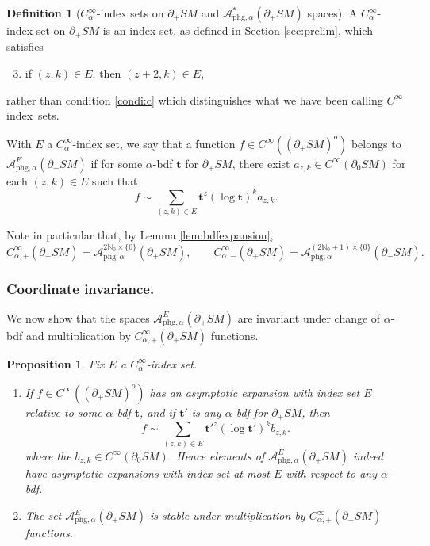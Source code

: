 \documentclass[11pt]{article}
\newenvironment{enumeratea}
{\bgroup\def\theenumi{\alph{enumi}}\begin{enumerate}}
{\end{enumerate}\egroup}
\theoremstyle{plain}
\newtheorem{Proposition}[Theorem]{Proposition}
\theoremstyle{definition}
\newtheorem{Definition}[Theorem]{Definition}
\theoremstyle{remark}
\def\Nm{{\mathbb{N}}}
\def\A{\mathcal{A}}
\newcommand{\bt}{{\boldsymbol{t}}}
\newcommand{\phg}{\mathrm{phg}}
\begin{document}
\begin{Definition}[$C_\alpha^\infty$-index sets on $\partial_+ SM$ and $\A^*_{\phg,\alpha}(\partial_+ SM)$ spaces]
A $C_\alpha^\infty$-index set on $\partial_+ SM$ is an index set, as defined in Section \ref{sec:prelim}, which satisfies
\begin{enumerate}\setcounter{enumi}{2}\renewcommand{\theenumi}{\alph{enumi}'}
\item\label{condi:c'}
if $(z,k)\in E$, then $(z+2,k)\in E$,
\end{enumerate}
rather than condition \eqref{condi:c} which distinguishes what we have been calling $C^\infty$ index~sets.

With $E$ a $C_\alpha^\infty$-index set, we say that a function $f\in C^\infty((\partial_{+}SM)^o)$ belongs to $\A_{\phg,\alpha}^E(\partial_+ SM)$ if for some $\alpha$-bdf $\bt$ for $\partial_+ SM$, there exist $a_{z,k}\in C^\infty (\partial_0 SM)$ for each $(z,k)\in E$ such that
\begin{equation*}
f \sim \sum_{(z,k)\in E} \bt^z (\log \bt)^k a_{z,k}.
\end{equation*}
\end{Definition}

Note in particular that, by Lemma \ref{lem:bdfexpansion},
\begin{equation*}
C^\infty_{\alpha,+} (\partial_+ SM) = \A_{\phg,\alpha}^{2\Nm_0\times \{0\}} (\partial_+ SM), \qquad C^\infty_{\alpha,-} (\partial_+ SM) = \A_{\phg,\alpha}^{(2\Nm_0+1)\times \{0\}} (\partial_+ SM).
\end{equation*}

\subsubsection*{Coordinate invariance.}
We now show that the spaces $\A_{\phg,\alpha}^E (\partial_+ SM)$ are invariant under change of $\alpha$-bdf and multiplication by $C_{\alpha,+}^\infty (\partial_+ SM)$ functions.

\begin{Proposition} Fix $E$ a $C^\infty_\alpha$-index set.
\begin{enumeratea}
\item
If $f\in C^\infty((\partial_+ SM)^o)$ has an asymptotic expansion with index set $E$ relative to some $\alpha$-bdf $\bt$, and if $\bt'$ is \emph{any} $\alpha$-bdf for $\partial_+ SM$, then\vspace*{-3pt}
\begin{equation*}
f \sim \sum_{(z,k)\in E} \bt'^z (\log \bt')^k b_{z,k}.
\end{equation*}
where the $b_{z,k} \in C^\infty(\partial_0 SM)$. Hence elements of $\A_{\phg,\alpha}^E(\partial_+ SM)$ indeed have asymptotic expansions with index set at most $E$ with respect to {\em any} $\alpha$-bdf.

\item
The set $\A_{\phg,\alpha}^E(\partial_+ SM)$ is stable under multiplication by $C_{\alpha,+}^\infty(\partial_+ SM)$ functions.
\end{enumeratea}
\end{Proposition}
\end{document}
